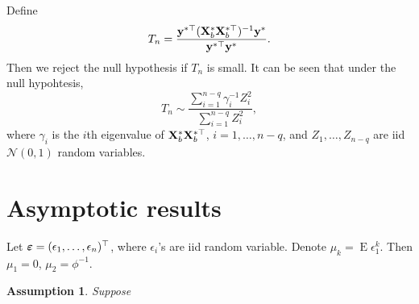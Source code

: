 \documentclass[11pt]{article}
\DeclareMathOperator{\myE}{E}
\newcommand{\By}{\mathbf{y}}    \newcommand{\Bz}{\mathbf{z}}
\theoremstyle{plain}
\newtheorem{assumption}{\quad\quad Assumption}
\theoremstyle{definition}
\theoremstyle{remark}
\begin{document}
Define
\begin{equation*}
    T_n= \frac{\By^{*\top} ( \BX_b^* \BX_b^{*\top} )^{-1} \By^* }{\By^{*\top} \By^*} .
\end{equation*}
Then we reject the null hypothesis if $T_n$ is small.
It can be seen that under the null hypohtesis,
\begin{equation*}
    T_n \sim
    \frac{\sum_{i=1}^{n-q} \gamma_i^{-1} Z_i^2}{\sum_{i=1}^{n-q} Z_i^2},
    \end{equation*}
    where $\gamma_i$ is the $i$th eigenvalue of $  \mathbf{X}_b^* \mathbf{X}_b^{*\top}$, $i=1,\ldots, n-q$, and $Z_1,\ldots, Z_{n-q}$ are iid $\mathcal N(0,1)$ random variables.




\section{Asymptotic results}
Let $\boldsymbol{\varepsilon}=(\epsilon_1,\ldots,\epsilon_n)^\top$, where $\epsilon_i$'s are iid random variable.
Denote $\mu_k=\myE \epsilon_1^k$.
Then $\mu_1=0$, $\mu_2=\phi^{-1}$.

\begin{assumption}
    Suppose 
\end{assumption}
\end{document}
